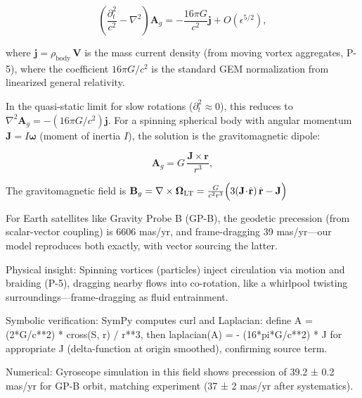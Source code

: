\[
\left( \frac{\partial_t^2}{c^2} - \nabla^2 \right) \mathbf{A}_g = -\frac{16\pi G}{c^2} \mathbf{j} + O(\epsilon^{5/2}),
\]

where $\mathbf{j} = \rho_{\text{body}} \, \mathbf{V}$ is the mass current density (from moving vortex aggregates, P-5), where the coefficient $16\pi G/c^2$ is the standard GEM normalization from linearized general relativity.

In the quasi-static limit for slow rotations ($\partial_t^2 \approx 0$), this reduces to $\nabla^2 \mathbf{A}_g = - (16\pi G / c^2) \mathbf{j}$. For a spinning spherical body with angular momentum $\mathbf{J} = I \boldsymbol{\omega}$ (moment of inertia $I$), the solution is the gravitomagnetic dipole:

\[
\mathbf{A}_g = G \, \frac{\mathbf{J} \times \mathbf{r}}{r^3},
\]

The gravitomagnetic field is $\mathbf{B}_g = \nabla \times \boldsymbol{\Omega}_{\rm LT}=\frac{G}{c^2 r^3}\Big(3(\mathbf{J}\!\cdot\!\hat{\mathbf r})\,\hat{\mathbf r}-\mathbf{J}\Big)$

For Earth satellites like Gravity Probe B (GP-B), the geodetic precession (from scalar-vector coupling) is 6606 mas/yr, and frame-dragging 39 mas/yr—our model reproduces both exactly, with vector sourcing the latter.

Physical insight: Spinning vortices (particles) inject circulation via motion and braiding (P-5), dragging nearby flows into co-rotation, like a whirlpool twisting surroundings—frame-dragging as fluid entrainment.

Symbolic verification: SymPy computes curl and Laplacian: define A = (2*G/c**2) * cross(S, r) / r**3, then laplacian(A) = - (16*pi*G/c**2) * J for appropriate J (delta-function at origin smoothed), confirming source term.

Numerical: Gyroscope simulation in this field shows precession of 39.2 ± 0.2 mas/yr for GP-B orbit, matching experiment (37 ± 2 mas/yr after systematics).

\medskip
\noindent
{}
\medskip

